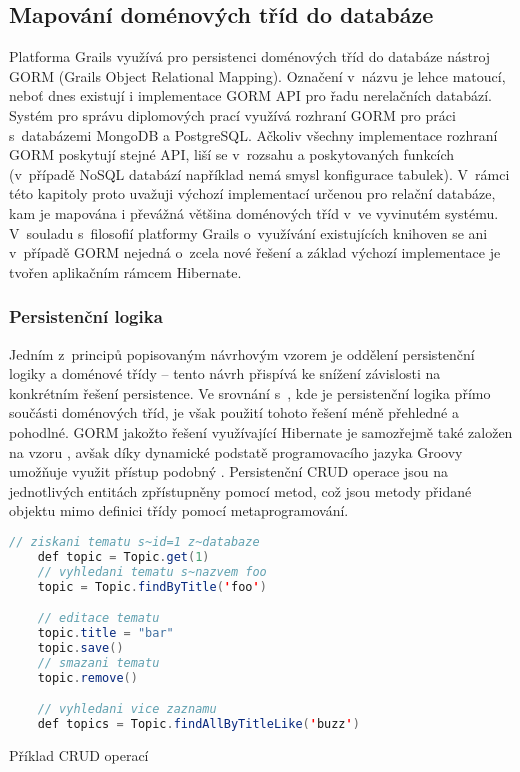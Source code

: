 \subsection{Mapování doménových tříd do databáze}
Platforma Grails využívá pro persistenci doménových tříd do databáze nástroj GORM (Grails Object Relational Mapping). Označení  v~názvu je lehce matoucí, neboť dnes existují i implementace GORM API pro řadu nerelačních databází. Systém pro správu diplomových prací využívá rozhraní GORM pro práci s~databázemi MongoDB a PostgreSQL. Ačkoliv všechny implementace rozhraní GORM poskytují stejné API, liší se v~rozsahu a poskytovaných funkcích (v~případě NoSQL databází například nemá smysl konfigurace tabulek). V~rámci této kapitoly proto uvažuji výchozí implementací určenou pro relační databáze, kam je mapována i převážná většina doménových tříd v~ve vyvinutém systému. V~souladu s~filosofií platformy Grails o~využívání existujících knihoven se ani v~případě GORM nejedná o~zcela nové řešení a základ výchozí implementace je tvořen aplikačním rámcem Hibernate.

\subsubsection{\textbf{Persistenční logika}}
Jedním z~principů popisovaným návrhovým vzorem  je oddělení persistenční logiky a doménové třídy -- tento návrh přispívá ke snížení závislosti na konkrétním řešení persistence. Ve srovnání s~, kde je persistenční logika přímo součásti doménových tříd, je však použití tohoto řešení méně přehledné a pohodlné. GORM jakožto řešení využívající Hibernate je samozřejmě také založen na vzoru , avšak díky dynamické podstatě programovacího jazyka Groovy umožňuje využit přístup podobný . Persistenční CRUD operace jsou na jednotlivých entitách zpřístupněny pomocí  metod, což jsou metody přidané objektu mimo definici třídy pomocí metaprogramování.

\begin{example}
\centering
\begin{lstlisting}[language=Java]
    // ziskani tematu s~id=1 z~databaze
    def topic = Topic.get(1)
    // vyhledani tematu s~nazvem foo
    topic = Topic.findByTitle('foo')

    // editace tematu
    topic.title = "bar"
    topic.save()
    // smazani tematu
    topic.remove()

    // vyhledani vice zaznamu
    def topics = Topic.findAllByTitleLike('buzz')
\end{lstlisting}
\caption{Příklad CRUD operací}
\end{example}


